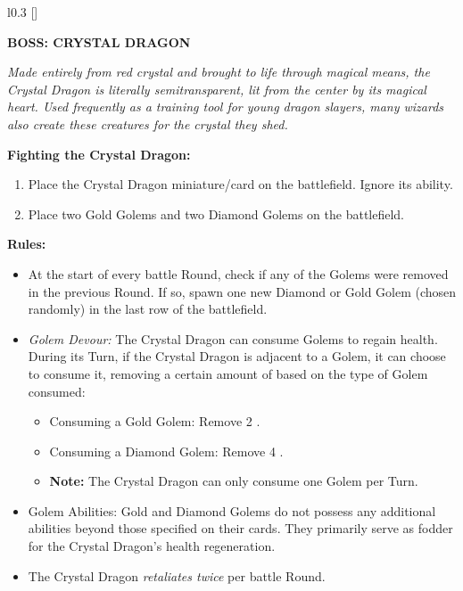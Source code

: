 \begin{wrapfigure}{l}{0.3\textwidth}
  \raisebox{0pt}[\dimexpr{}\baselineskip\relax]{}
\end{wrapfigure}
{
  \textbf{\MakeUppercase{Boss: Crystal Dragon}}

  \medskip

  \textit{Made entirely from red crystal and brought to life through magical means, the Crystal Dragon is literally semitransparent, lit from the center by its magical heart.
    Used frequently as a training tool for young dragon slayers, many wizards also create these creatures for the crystal they shed.
  }

  \medskip

  \textbf{Fighting the Crystal Dragon:}
  \begin{enumerate}
    \item Place the Crystal Dragon miniature/card on the battlefield.
      Ignore its ability.
    \item Place two Gold Golems and two Diamond Golems on the battlefield.
  \end{enumerate}

  \medskip

  \textbf{Rules:}
  \begin{itemize}
    \item At the start of every battle Round, check if any of the Golems were removed in the previous Round.
      If so, spawn one new Diamond or Gold Golem (chosen randomly) in the last row of the battlefield.
    \item \textit{Golem Devour:} The Crystal Dragon can consume Golems to regain health.
      During its Turn, if the Crystal Dragon is adjacent to a Golem, it can choose to consume it, removing a certain amount of  based on the type of Golem consumed:
      \begin{itemize}
        \item Consuming a Gold Golem: Remove 2 .
        \item Consuming a Diamond Golem: Remove 4 .
        \item[] \textbf{Note:} The Crystal Dragon can only consume one Golem per Turn.
      \end{itemize}
    \item Golem Abilities: Gold and Diamond Golems do not possess any additional abilities beyond those specified on their cards.
      They primarily serve as fodder for the Crystal Dragon's health regeneration.
    \item The Crystal Dragon \textit{retaliates twice} per battle Round.
  \end{itemize}
}

